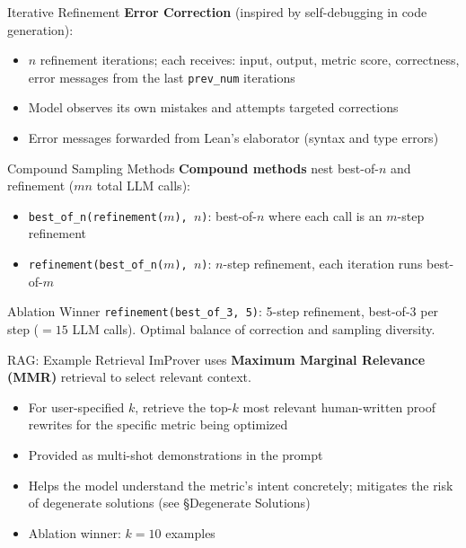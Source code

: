 \documentclass{beamer}
\begin{document}
\begin{frame}{Iterative Refinement}
\vspace{0.8em}
\textbf{Error Correction} (inspired by self-debugging in code generation):
\vspace{0.5em}
\begin{itemize}\setlength{\itemsep}{10pt}
  \item $n$ refinement iterations; each receives: input, output, metric score, correctness, error messages from the last \texttt{prev\_num} iterations
  \item Model observes its own mistakes and attempts targeted corrections
  \item Error messages forwarded from Lean's elaborator (syntax and type errors)
\end{itemize}
\end{frame}

\begin{frame}{Compound Sampling Methods}
\vspace{0.5em}
\textbf{Compound methods} nest best-of-$n$ and refinement ($mn$ total LLM calls):
\vspace{0.4em}
\begin{itemize}\setlength{\itemsep}{8pt}
  \item \texttt{best\_of\_n(refinement($m$), $n$)}: best-of-$n$ where each call is an $m$-step refinement
  \item \texttt{refinement(best\_of\_n($m$), $n$)}: $n$-step refinement, each iteration runs best-of-$m$
\end{itemize}
\vspace{0.6em}
\begin{block}{Ablation Winner}
  \texttt{refinement(best\_of\_3, 5)}: 5-step refinement, best-of-3 per step ($= 15$ LLM calls). Optimal balance of correction and sampling diversity.
\end{block}
\end{frame}

\begin{frame}{RAG: Example Retrieval}
\vspace{0.8em}
ImProver uses \textbf{Maximum Marginal Relevance (MMR)} retrieval to select relevant context.
\vspace{0.6em}
\begin{itemize}\setlength{\itemsep}{10pt}
  \item For user-specified $k$, retrieve the top-$k$ most relevant human-written proof rewrites for the specific metric being optimized
  \item Provided as multi-shot demonstrations in the prompt
  \item Helps the model understand the metric's intent concretely; mitigates the risk of degenerate solutions (see \S Degenerate Solutions)
  \item Ablation winner: $k = 10$ examples
\end{itemize}
\end{frame}
\end{document}

